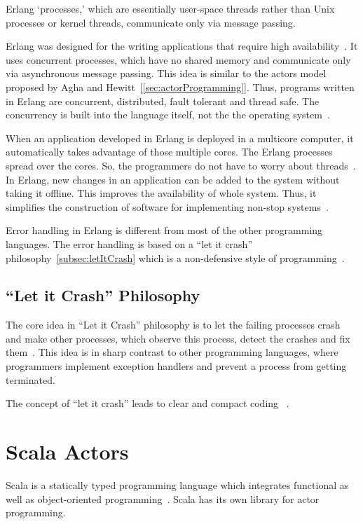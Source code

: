   Erlang ‘processes,’ which are essentially user-space threads rather than Unix processes or kernel threads, communicate only via message passing.

  Erlang was designed for the writing applications that require high availability~\cite{armstrong}. It uses concurrent processes, which have no shared memory and communicate only via asynchronous message passing. This idea is similar to the actors model proposed by Agha and Hewitt~[\autoref{sec:actorProgramming}]. Thus, programs written in Erlang are concurrent, distributed, fault tolerant and thread safe. The concurrency is built into the language itself, not the the operating system~\cite{Armstrong:2010:ERL:1810891.1810910}.

  When an application developed in Erlang is deployed in a multicore computer, it automatically takes advantage of those multiple cores. The Erlang processes spread over the cores. So, the programmers do not have to worry about threads~\cite{Armstrong:2010:ERL:1810891.1810910}. In Erlang, new changes in an application can be added to the system without taking it offline. This improves the availability of whole system. Thus, it simplifies the construction of software for implementing non-stop systems~\cite{armstrong}.

  Error handling in Erlang is different from most of the other programming languages. The error handling is based on a “let it crash” philosophy~\autoref{subsec:letItCrash} which is a non-defensive style of programming~\cite{armstrong, Armstrong:2010:ERL:1810891.1810910}.

\subsection{“Let it Crash” Philosophy}
\label{subsec:letItCrash}
  The core idea in “Let it Crash” philosophy is to let the failing processes crash and make other processes, which observe this process, detect the crashes and fix them~\cite{Armstrong:2010:ERL:1810891.1810910}. This idea is in sharp contrast to other programming languages, where programmers implement exception handlers and prevent a process from getting terminated.

  The concept of “let it crash” leads to clear and compact coding
~\cite{Armstrong:2010:ERL:1810891.1810910}.

\section{Scala Actors}
Scala is a statically typed programming language which integrates functional as well as object-oriented programming~\cite{Odersky}. Scala has its own library for actor programming.

